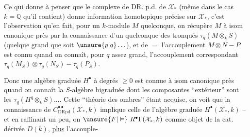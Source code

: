 Ce qui donne à penser que le complexe de DR. p.d. de $\mathcal X_*$  (même dans le cas $k=\mathbb Q$ qu'il contient) donne  information homotopique précise sur $\mathcal X_*$, c'est l'observation qu'en fait, pour un  $k$-module $M$ quelconque, on récupère $M$ à isom canonique près par la connaissance d'un quelconque des tronqués $\tau_q(M\otimes_k S)$  (quelque grand que soit $\unsure{p|q}\ldots$), et de $=$ l'accouplement $M\otimes N\mathbin{-}P$ est connu quand on connaît, pour $q$ assez grand, l'accouplement correspondant $\tau_q(M_S)\otimes\tau_q(N_S)\mathbin{-}\tau_q(P_S)$.

Donc une algèbre graduée $H^\bullet$ à degrés $\geq0$  est connue à isom canonique près quand on connaît la $S$-algèbre bigraduée dont les composantes  ``extérieur''  sont les $\tau_q(H^q\otimes_k S)$....  Cette ``théorie des ombres'' étant  acquise, on voit que la connaissance de $C^{\bullet\bullet}_{\mathrm{DRpd}}(\mathcal X_*,k)$  implique celle de l'algèbre graduée $H^\bullet(\mathcal X_*,k)$ -- et en raffinant un peu, on  $\unsure{F|\vDash}\ R^\bullet\Gamma(\mathcal X_*,k)$ comme objet de la cat. dérivée $D(k)$, \uline{plus} l'accouple-
